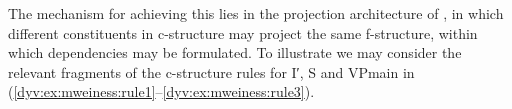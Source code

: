 \documentclass[output=paper]{langsci/langscibook}
\begin{document}
The mechanism for achieving this lies in the projection architecture of , in which different constituents in c-structure may project the same f-structure, within which dependencies may be formulated.
To illustrate we may consider the relevant fragments of the c-structure rules for I′, S and VPmain in (\ref{dyv:ex:mweiness:rule1}--\ref{dyv:ex:mweiness:rule3}).



\end{document}
